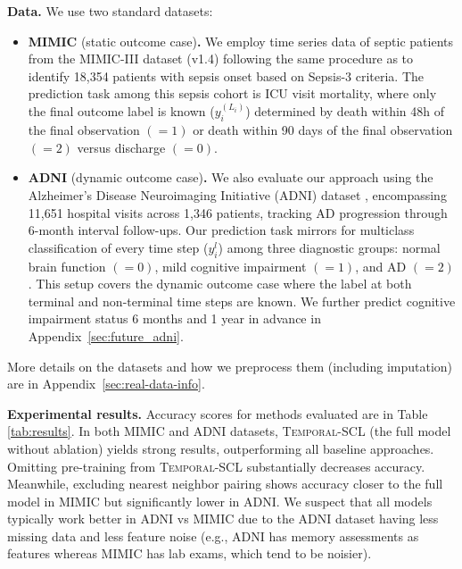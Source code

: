 \documentclass[pmlr,twocolumn,10pt]{jmlr} %
\begin{document}
\noindent
\textbf{Data.}
We use two standard datasets: %
\begin{itemize}[leftmargin=*,itemsep=0pt,parsep=0pt,topsep=1pt]
\item[$\bullet$]
\textbf{MIMIC }(static outcome case)\textbf{.}
We employ time series data of septic patients from the MIMIC-III dataset (v1.4) \citep{johnson2018mimic} following the same procedure as \citet{komorowski2018artificial} to identify 18,354 patients with sepsis onset based on Sepsis-3 criteria. 
The prediction task among this sepsis cohort is ICU visit mortality, where only the final outcome label is known 
 ($y_i^{(L_i)}$) determined by death within 48h of the final observation $(=1)$ or death within 90 days of the final observation $(=2)$ versus discharge $(=0)$.

\item[$\bullet$]
\textbf{ADNI }(dynamic outcome case)\textbf{.} 
We also evaluate our approach using the Alzheimer's Disease Neuroimaging Initiative (ADNI) dataset \citep{petersen2010alzheimer}, encompassing 11,651 hospital visits across 1,346 patients, tracking AD progression through 6-month interval follow-ups.
Our prediction task mirrors \cite{lee2020outcome} for multiclass classification of every time step ($y_i^{l}$) among three diagnostic groups: normal brain function $(=0)$, mild cognitive impairment $(=1)$, and AD $(=2)$.
This setup covers the dynamic outcome case where the label at both terminal and non-terminal time steps are known.
We further predict cognitive impairment status 6 months and 1 year in advance in Appendix~\ref{sec:future_adni}.

\end{itemize}
More details on the datasets and how we preprocess them (including imputation) are in Appendix~\ref{sec:real-data-info}.

\noindent
\textbf{Experimental results.} Accuracy scores for methods evaluated are in Table \ref{tab:results}. In both MIMIC and ADNI datasets, \textsc{Temporal-SCL} (the full model without ablation) yields strong results, outperforming all baseline approaches. Omitting pre-training from \textsc{Temporal-SCL} substantially decreases accuracy. Meanwhile, excluding nearest neighbor pairing shows accuracy closer to the full model in MIMIC but significantly lower in ADNI. We suspect that all models typically work better in ADNI vs MIMIC due to the ADNI dataset having less missing data and less feature noise (e.g., ADNI has memory assessments as features whereas MIMIC has lab exams, which tend to be noisier). 
\end{document}
